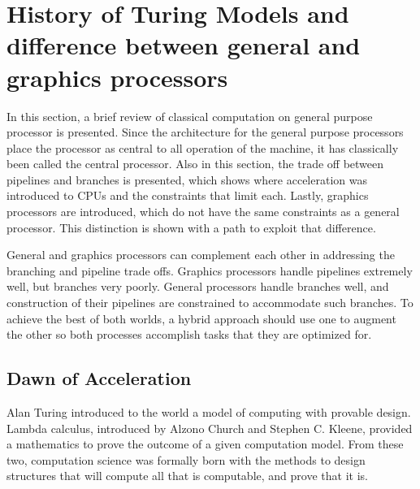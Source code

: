 \documentclass[11pt]{article}
\begin{document}
\section{History of Turing Models and difference between general and graphics processors}\label{compuational-motivation}
In this section, a brief review of classical computation on general purpose processor is presented.  Since the architecture for the general purpose processors place the processor as central to all operation of the machine, it has classically been called the central processor.  Also in this section, the trade off between pipelines and branches is presented, which shows where acceleration was introduced to CPUs and the constraints that limit each.   Lastly, graphics processors are introduced, which do not have the same constraints as a general processor. This distinction is shown with a path to exploit that difference.


General and graphics processors can complement each other in addressing the branching and pipeline trade offs.  Graphics processors handle pipelines extremely well, but branches very poorly.  General processors handle branches well, and construction of their pipelines are constrained to accommodate such branches.  To achieve the best of both worlds, a hybrid approach should use one to augment the other so both processes accomplish tasks that they are optimized for.  





\subsection{Dawn of Acceleration}
Alan Turing \cite{turing-computable-numbers} introduced to the world a model of computing with provable design.  Lambda calculus, introduced by Alzono Church \cite{church-unsolvable-problems, church-logic-foundation-postulates} and Stephen C. Kleene\cite{kleene-lambda},  provided a mathematics to prove the outcome of a given computation model.  From these two, computation science was formally born with the methods to design structures that will compute all that is computable, and prove that it is.  
\end{document}
